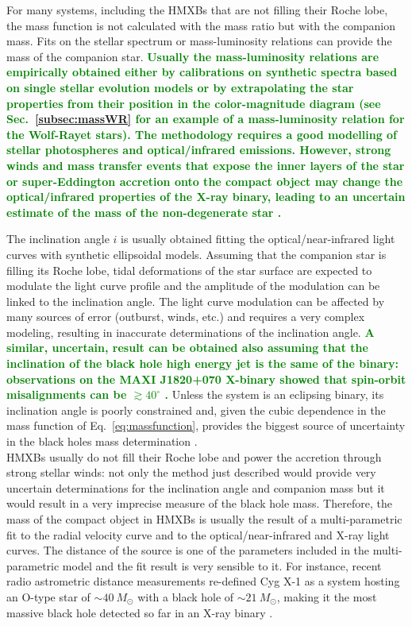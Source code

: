 \documentclass[a4paper,titlepage]{book}     	%
\newcommand{\sun}{\ensuremath{_\odot}}
\newcommand{\msun}{\ensuremath{M\sun}}
\newcommand{\erika}[1]{\textcolor{green}{\bf#1}}
\begin{document}
For many systems, including the HMXBs that are not filling their Roche lobe, the mass function is not calculated with the mass ratio but with the companion mass. Fits on the stellar spectrum or mass-luminosity relations can provide the mass of the companion star. \erika{Usually the mass-luminosity relations are empirically obtained either by calibrations on synthetic spectra based on single stellar evolution models or by extrapolating the star properties from their position in the color-magnitude diagram (see Sec.\ \ref{subsec:massWR} for an example of a mass-luminosity relation for the Wolf-Rayet stars). The methodology requires a good modelling of stellar photospheres and optical/infrared emissions. However, strong winds and mass transfer events that expose the inner layers of the star or super-Eddington accretion onto the compact object may change the optical/infrared properties of the X-ray binary, leading to an uncertain estimate of the mass of the non-degenerate star \cite{superEddingtonaccBH_Ambrosi2018}. }

The inclination angle $i$ is usually obtained fitting the optical/near-infrared light curves with synthetic ellipsoidal models. Assuming that the companion star is filling its Roche lobe, tidal deformations of the star surface are expected to modulate the light curve profile and the amplitude of the modulation can be linked to the inclination angle. The light curve modulation can be affected by many sources of error (outburst, winds, etc.) and requires a very complex modeling, resulting in inaccurate determinations of the inclination angle. \erika{A similar, uncertain, result can be obtained also assuming that the inclination of the black hole high energy jet is the same of the binary: observations on the MAXI J1820+070 X-binary showed that spin-orbit misalignments can be $\gtrsim 40^{\circ}$ \cite{BHspinmisaligned_2022}.} Unless the system is an eclipsing binary, its inclination angle is poorly constrained and, given the cubic dependence in the mass function of Eq.\ \ref{eq:massfunction}, provides the biggest source of uncertainty in the black holes mass determination \cite{Xbinaries_massmeasure}.\\


HMXBs usually do not fill their Roche lobe and power the accretion through strong stellar winds: not only the method just described would provide very uncertain determinations for the inclination angle and companion mass but it would result in a very imprecise measure of the black hole mass. Therefore, the mass of the compact object in HMXBs is usually the result of a multi-parametric fit to the radial velocity curve and to the optical/near-infrared and X-ray light curves. The distance of the source is one of the parameters included in the multi-parametric model and the fit result is very sensible to it. For instance, recent radio astrometric distance measurements re-defined Cyg X-1 as a system hosting an O-type star of $\sim 40~\msun$ with a black hole of $\sim 21~\msun$, making it the most massive black hole detected so far in an X-ray binary \cite{cygnusx1}.
\end{document}
